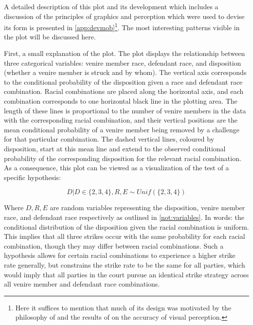 A detailed description of this plot and its development which includes a discussion of the principles of graphics and perception
which were used to devise its form is presented in \ref{app:devmob}\footnote{Here it suffices to mention that much of its design
  was motivated by the philosophy of \cite{VisualDisplayQuant} and the results of \cite{cleveland1987} on the accuracy of visual
  perception.}. The most interesting patterns visible in the plot will be discussed here.

First, a small explanation of the plot. The plot displays the relationship between three categorical variables: venire member
race, defendant race, and disposition (whether a venire member is struck and by whom). The vertical axis corresponds to the
conditional probability of the disposition given a race and defendant race combination. Racial combinations are placed along the
horizontal axis, and each combination corresponds to one horizontal black line in the plotting area. The length of these lines is
proportional to the number of venire members in the data with the corresponding racial combination, and their vertical positions
are the mean conditional probability of a venire member being removed by a challenge for that particular combination. The dashed
vertical lines, coloured by disposition, start at this mean line and extend to the observed conditional probability of the
corresponding disposition for the relevant racial combination. As a consequence, this plot can be viewed as a visualization of the
test of a specific hypothesis:

\begin{equation}
  \label{eq:vishyp}
  D | D \in \{2,3,4\}, R, E \sim Unif(\{2,3,4\})
\end{equation}

Where $D, R, E$ are random variables representing the disposition, venire member race, and defendant race respectively as outlined
in \ref{not:variables}. In words: the conditional distribution of the disposition given the racial combination is uniform. This
implies that all three strikes occur with the same probability for each racial combination, though they may differ between racial
combinations. Such a hypothesis allows for certain racial combinations to experience a higher strike rate generally, but
constrains the strike rate to be the same for all parties, which would imply that all parties in the court pursue an identical
strike strategy across all venire member and defendant race combinations.

